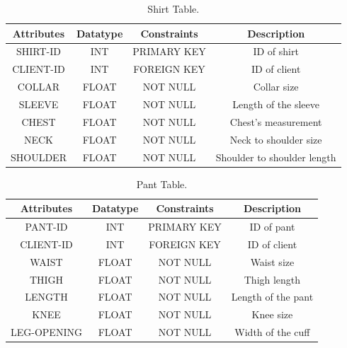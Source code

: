 \documentclass[12pt, letter paper]{report}
\begin{document}
{\begin{center}
\begin{table}[h!]
\centering
    \begin{tabular}{|c|c|c|c|}
    \hline
      Attributes &Datatype &Constraints&Description  \\
      \hline
      \hline
         SHIRT-ID&INT&PRIMARY KEY&ID of shirt  \\
         \hline
         CLIENT-ID&INT&FOREIGN KEY&ID of client\\
         \hline
         COLLAR&FLOAT&NOT NULL& Collar size\\ 
         \hline
         SLEEVE&FLOAT&NOT NULL& Length of the sleeve\\ 
         \hline
         CHEST&FLOAT&NOT NULL& Chest's measurement\\
         \hline
         NECK&FLOAT&NOT NULL&Neck to shoulder size\\
         \hline
         SHOULDER&FLOAT&NOT NULL&Shoulder to shoulder length\\
         \hline
    \end{tabular}
    \caption{Shirt Table.}
\label{table:2}
    \end{table}
\end{center}

\begin{center}
\begin{table}[h!]
\centering
    \begin{tabular}{|c|c|c|c|}
    \hline
      Attributes &Datatype &Constraints&Description  \\
      \hline
      \hline
         PANT-ID&INT&PRIMARY KEY&ID of pant  \\
         \hline
         CLIENT-ID&INT&FOREIGN KEY&ID of client\\
         \hline
         WAIST&FLOAT&NOT NULL& Waist size\\ 
         \hline
         THIGH&FLOAT&NOT NULL& Thigh length\\ 
         \hline
         LENGTH&FLOAT&NOT NULL& Length of the pant\\
         \hline
         KNEE&FLOAT&NOT NULL&Knee size\\
         \hline
         LEG-OPENING&FLOAT&NOT NULL&Width of the cuff\\
         \hline
    \end{tabular}
    \caption{Pant Table.}
\label{table:3}
    \end{table}
\end{center}

}
\end{document}
